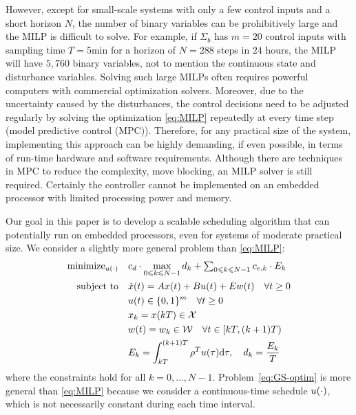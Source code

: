 However, except for small-scale systems with only a few control inputs and a short horizon $N$, the number of binary variables can be prohibitively large and the MILP is difficult to solve.
For example, if $\Sigma_b$ has %
$m=20$ control inputs with sampling time $T = 5 \text{min}$ for a horizon of $N = 288$ steps in $24$ hours, the MILP will have $5 \comma 760$ binary variables, not to mention the continuous state and disturbance variables.
Solving such large MILPs often requires powerful computers with commercial optimization
solvers.
Moreover, due to the uncertainty caused by the disturbances, the control decisions need to be adjusted regularly by solving the optimization \eqref{eq:MILP} repeatedly at every time step (model predictive control (MPC)).
Therefore, for any practical size of the system, implementing this approach can be highly demanding, if even possible, in terms of run-time hardware and software requirements.
Although there are techniques in MPC to reduce the complexity, \eg move blocking, an MILP solver is still required.
Certainly the controller cannot be implemented on an embedded processor with limited processing power and memory.


Our goal in this paper is to develop a scalable %
scheduling algorithm that can potentially run on embedded processors, even for systems of moderate practical size.
We consider a slightly more general problem than \eqref{eq:MILP}:
\begin{align}
  \operatorname{minimize}_{u (\cdot)} \quad & c_d \cdot \max_{0 \leqslant k \leqslant
  N - 1} d_k + \textstyle\sum_{0 \leqslant k \leqslant N - 1} c_{e, k} \cdot E_k 
  \label{eq:GS-optim}\\
  \text{subject to} \quad
  & \dot{x} (t) = Ax (t) + Bu (t) + Ew (t) \quad \forall t \geq 0 \nonumber\\
  & u(t) \in \{0,1\}^{m} \quad \forall t \geq 0 \nonumber\\
  & x_{k} = x (kT) \in \mathcal{X} \nonumber\\
  & w (t) = w_{k} \in \mathcal{W} \quad \forall t \in [kT, (k + 1) T) \nonumber\\
  & E_k = \int_{kT}^{(k + 1) T} \rho^{T} u(\tau) \mathrm{d} \tau, \quad d_k = \frac{E_k}{T} \nonumber
\end{align}
where the constraints hold for all $k = 0, \ldots, N - 1$.
Problem~\eqref{eq:GS-optim} is more general than \eqref{eq:MILP} because we consider a
continuous-time schedule $u (\cdot)$, which is not necessarily constant
during each time interval.



